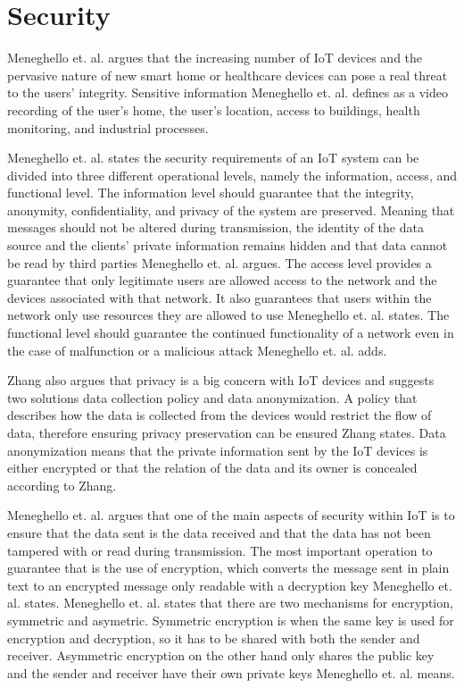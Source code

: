 \section{Security}
Meneghello et. al. argues that the increasing number of IoT devices and the pervasive nature of new smart home or healthcare devices can pose a real threat to the users' integrity.
Sensitive information Meneghello et. al. defines as a video recording of the user's home, the user's location, access to buildings, health monitoring, and industrial processes.\cite{Meneghello2019}

Meneghello et. al. states the security requirements of an IoT system can be divided into three different operational levels, namely the information, access, and functional level.\cite{Meneghello2019}
The information level should guarantee that the integrity, anonymity, confidentiality, and privacy of the system are preserved. 
Meaning that messages should not be altered during transmission, the identity of the data source and the clients' private information remains hidden and that data cannot be read by third parties Meneghello et. al. argues.\cite{Meneghello2019} 
The access level provides a guarantee that only legitimate users are allowed access to the network and the devices associated with that network. 
It also guarantees that users within the network only use resources they are allowed to use Meneghello et. al. states.\cite{Meneghello2019}
The functional level should guarantee the continued functionality of a network even in the case of malfunction or a malicious attack Meneghello et. al. adds.\cite{Meneghello2019}

Zhang also argues that privacy is a big concern with IoT devices and suggests two solutions data collection policy and data anonymization.\cite{Zhang2014}
A policy that describes how the data is collected from the devices would restrict the flow of data, therefore ensuring privacy preservation can be ensured Zhang states.\cite{Zhang2014}
Data anonymization means that the private information sent by the IoT devices is either encrypted or that the relation of the data and its owner is concealed according to Zhang.\cite{Zhang2014}

Meneghello et. al. argues that one of the main aspects of security within IoT is to ensure that the data sent is the data received and that the data has not been tampered with or read during transmission.
The most important operation to guarantee that is the use of encryption, which converts the message sent in plain text to an encrypted message only readable with a decryption key Meneghello et. al. states.\cite{Meneghello2019}
Meneghello et. al. states that there are two mechanisms for encryption, symmetric and asymetric.\cite{Meneghello2019} 
Symmetric encryption is when the same key is used for encryption and decryption, so it has to be shared with both the sender and receiver.
Asymmetric encryption on the other hand only shares the public key and the sender and receiver have their own private keys Meneghello et. al. means.\cite{Meneghello2019}

